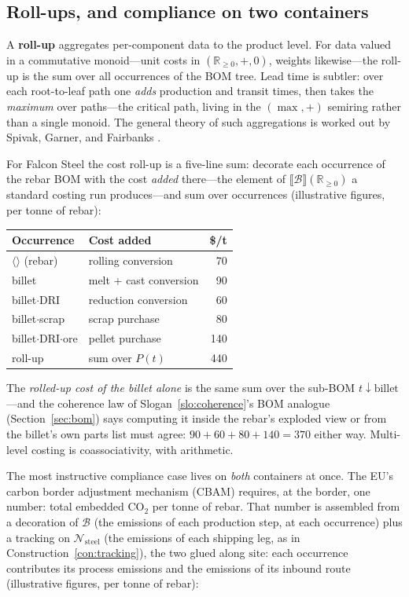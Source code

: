 \documentclass[11pt,a4paper]{article}
\newcommand{\Ext}[1]{\llbracket #1 \rrbracket}
\newcommand{\N}{\mathcal{N}}
\newcommand{\B}{\mathcal{B}}
\newcommand{\dc}{\mathbin{\downarrow}}
\newcommand{\site}{\mathrm{site}}
\theoremstyle{plain}
\theoremstyle{definition}
\theoremstyle{remark}
\begin{document}
\subsection{Roll-ups, and compliance on two containers}\label{sec:rollups}

A \textbf{roll-up} aggregates per-component data to the product
level. For data valued in a commutative monoid---unit costs in
$(\mathbb{R}_{\geq 0}, +, 0)$, weights likewise---the roll-up is the
sum over all occurrences of the BOM tree. Lead time is subtler: over
each root-to-leaf path one \emph{adds} production and transit times,
then takes the \emph{maximum} over paths---the critical path, living
in the $(\max, +)$ semiring rather than a single monoid. The general
theory of such aggregations is worked out by Spivak, Garner, and
Fairbanks \cite{spivak-aggregation}.

For Falcon Steel the cost roll-up is a five-line sum: decorate each
occurrence of the rebar BOM with the cost \emph{added} there---the
element of $\Ext{\B}(\mathbb{R}_{\geq 0})$ a standard costing run
produces---and sum over occurrences (illustrative figures, per tonne
of rebar):

\begin{center}
\small
\begin{tabular}{llr}
\toprule
Occurrence & Cost added & \$/t \\
\midrule
$\langle\rangle$ (rebar) & rolling conversion & 70 \\
billet & melt + cast conversion & 90 \\
billet$\cdot$DRI & reduction conversion & 60 \\
billet$\cdot$scrap & scrap purchase & 80 \\
billet$\cdot$DRI$\cdot$ore & pellet purchase & 140 \\
\midrule
roll-up & sum over $P(t)$ & 440 \\
\bottomrule
\end{tabular}
\end{center}

The \emph{rolled-up cost of the billet alone} is the same sum over
the sub-BOM $t \dc \text{billet}$---and the coherence law of
Slogan~\ref{slo:coherence}'s BOM analogue (Section~\ref{sec:bom})
says computing it inside the rebar's exploded view or from the
billet's own parts list must agree: $90 + 60 + 80 + 140 = 370$
either way. Multi-level costing is coassociativity, with arithmetic.

The most instructive compliance case lives on \emph{both} containers
at once. The EU's carbon border adjustment mechanism (CBAM) requires,
at the border, one number: total embedded CO$_2$ per tonne of rebar.
That number is assembled from a decoration of $\B$ (the emissions of
each production step, at each occurrence) plus a tracking on
$\N_{\mathrm{steel}}$ (the emissions of each shipping leg, as in
Construction~\ref{con:tracking}), the two glued along $\site$: each
occurrence contributes its process emissions and the emissions of its
inbound route (illustrative figures, per tonne of rebar):
\end{document}
